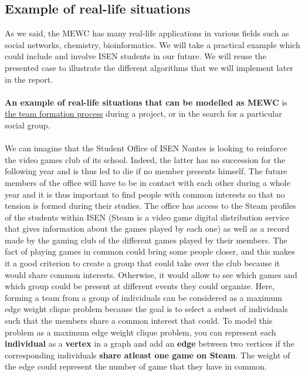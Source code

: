\documentclass{article}
\begin{document}


\subsection{Example of real-life situations}

    As we said, the MEWC has many real-life applications in various fields such as social networks, chemistry, bioinformatics. We will take a practical example which could include and involve ISEN students in our future. We will reuse the presented case to illustrate the different algorithms that we will implement later in the report.\\ \\
    \textbf{An example of real-life situations that can be modelled as MEWC} is \underline{the team formation process} during a project, or in the search for a particular social group. 
    \\ \\
    We can imagine that the Student Office of ISEN Nantes is looking to reinforce the video games club of its school. Indeed, the latter has no succession for the following year and is thus led to die if no member presents himself. The future members of the office will have to be in contact with each other during a whole year and it is thus important to find people with common interests so that no tension is formed during their studies. The office has access to the Steam profiles of the students within ISEN (Steam is a video game digital distribution service that gives information about the games played by each one) as well as a record made by the gaming club of the different games played by their members. The fact of playing games in common could bring some people closer, and this makes it a good criterion to create a group that could take over the club because it would share common interests. Otherwise, it would allow to see which games and which group could be present at different events they could organize. Here, forming a team from a group of individuals can be considered as a maximum edge weight clique problem because the goal is to select a subset of individuals such that the members share a common interest that could.
    \newpage
    To model this problem as a maximum edge weight clique problem, you can represent each \textbf{individual} as a \textbf{vertex} in a graph and add an \textbf{edge} between two vertices if the corresponding individuals \textbf{share atleast one game on Steam}. The weight of the edge could represent the number of game that they have in common.
\end{document}

